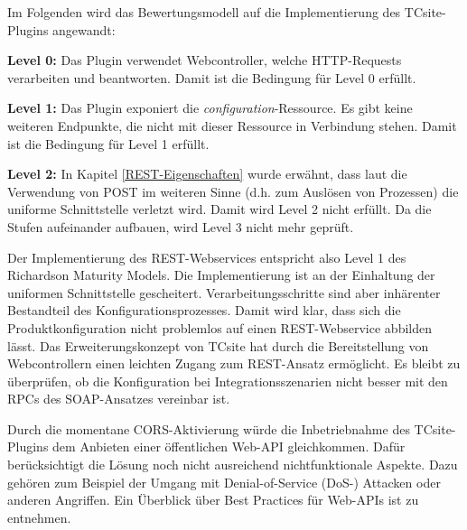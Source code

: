 \documentclass[11pt, a4paper, titlepage, listof=totoc, bibliography=totoc, index=totoc, twoside, openright, headings=normal]{scrreprt}
\begin{document}
Im Folgenden wird das Bewertungsmodell auf die Implementierung des TCsite-Plugins angewandt:
\begin{compactitem}
\item\textbf{Level 0:} Das Plugin verwendet Webcontroller, welche HTTP-Requests verarbeiten und beantworten. Damit ist die Bedingung für Level 0 erfüllt.
\item\textbf{Level 1:} Das Plugin exponiert die \emph{configuration}-Ressource. Es gibt keine weiteren Endpunkte, die nicht mit dieser Ressource in Verbindung stehen. Damit ist die Bedingung für Level 1 erfüllt.
\item\textbf{Level 2:} In Kapitel \ref{REST-Eigenschaften} wurde erwähnt, dass laut \citet{richardson07} die Verwendung von POST im weiteren Sinne (d.h. zum Auslösen von Prozessen) die uniforme Schnittstelle verletzt wird. Damit wird Level 2 nicht erfüllt. Da die Stufen aufeinander aufbauen, wird Level 3 nicht mehr geprüft.
\end{compactitem}

Der Implementierung des REST-Webservices entspricht also Level 1 des \glqq Richardson Maturity Models\grqq{}. Die Implementierung ist an der Einhaltung der uniformen Schnittstelle gescheitert. Verarbeitungsschritte sind aber inhärenter Bestandteil des Konfigurationsprozesses. Damit wird klar, dass sich die Produktkonfiguration nicht problemlos auf einen REST-Webservice abbilden lässt. Das Erweiterungskonzept von TCsite hat durch die Bereitstellung von Webcontrollern einen leichten Zugang zum REST-Ansatz ermöglicht. Es bleibt zu überprüfen, ob die Konfiguration bei Integrationsszenarien nicht besser mit den RPCs des SOAP-Ansatzes vereinbar ist.

Durch die momentane CORS-Aktivierung würde die Inbetriebnahme des TCsite-Plugins dem Anbieten einer öffentlichen Web-API gleichkommen. Dafür berücksichtigt die Lösung noch nicht ausreichend nichtfunktionale Aspekte. Dazu gehören zum Beispiel der Umgang mit Denial-of-Service (DoS-) Attacken oder anderen Angriffen. Ein Überblick über Best Practices für Web-APIs ist \citet{tilkov11} zu entnehmen.
\end{document}
